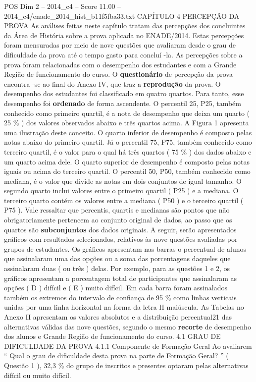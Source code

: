 \begin{textsample}{POS Dim 2 – 2014\_c4 – Score 11.00 – 2014\_c4/enade\_2014\_hist\_b11f5fba33.txt}  \label{ex:f2_pos_119}
CAPÍTULO 4 PERCEPÇÃO DA PROVA As análises feitas neste capítulo tratam das percepções dos concluintes da Área de História sobre a prova aplicada no ENADE/2014.
Estas percepções foram mensuradas por meio de nove questões que avaliaram desde o grau de dificuldade da prova até o tempo gasto para concluí -la.
As percepções sobre a prova foram relacionadas com o desempenho dos estudantes e com a Grande Região de funcionamento do curso.
O \textbf{questionário} de percepção da prova encontra -se ao final do Anexo IV, que traz a \textbf{reprodução} da prova.
O desempenho dos estudantes foi classificado em quatro quartos.
Para tanto, esse desempenho foi \textbf{ordenado} de forma ascendente.
O percentil 25, P25, também conhecido como primeiro quartil, é a nota de desempenho que deixa um quarto ( 25 \% ) dos valores observados abaixo e três quartos acima.
A Figura 1 apresenta uma ilustração deste conceito.
O quarto inferior de desempenho é composto pelas notas abaixo do primeiro quartil.
Já o percentil 75, P75, também conhecido como terceiro quartil, é o valor para o qual há três quartos ( 75 \% ) dos dados abaixo e um quarto acima dele.
O quarto superior de desempenho é composto pelas notas iguais ou acima do terceiro quartil.
O percentil 50, P50, também conhecido como mediana, é o valor que divide as notas em dois conjuntos de igual tamanho.
O segundo quarto inclui valores entre o primeiro quartil ( P25 ) e a mediana.
O terceiro quarto contém os valores entre a mediana ( P50 ) e o terceiro quartil ( P75 ).
Vale ressaltar que percentis, quartis e medianas são pontos que não obrigatoriamente pertencem ao conjunto original de dados, ao passo que os quartos são \textbf{subconjuntos} dos dados originais.
A seguir, serão apresentados gráficos com resultados selecionados, relativos às nove questões avaliadas por grupos de estudantes.
Os gráficos apresentam nas barras o percentual de alunos que assinalaram uma das opções ou a soma das porcentagens daqueles que assinalaram duas ( ou três ) delas.
Por exemplo, para as questões 1 e 2, os gráficos apresentam a porcentagem total de participantes que assinalaram as opções ( D ) difícil e ( E ) muito difícil.
Em cada barra foram assinalados também os extremos do intervalo de confiança de 95 \% como linhas verticais unidas por uma linha horizontal na forma da letra H maiúscula.
As Tabelas no Anexo II apresentam os valores absolutos e a distribuição percentual21 das alternativas válidas das nove questões, segundo o mesmo \textbf{recorte} de desempenho dos alunos e Grande Região de funcionamento do curso. 4.1 GRAU DE DIFICULDADE DA PROVA 4.1.1 Componente de Formação Geral Ao avaliarem “ Qual o grau de dificuldade desta prova na parte de Formação Geral? ” ( Questão 1 ), 32,3 \% do grupo de inscritos e presentes optaram pelas alternativas difícil ou muito difícil.

\end{textsample}
